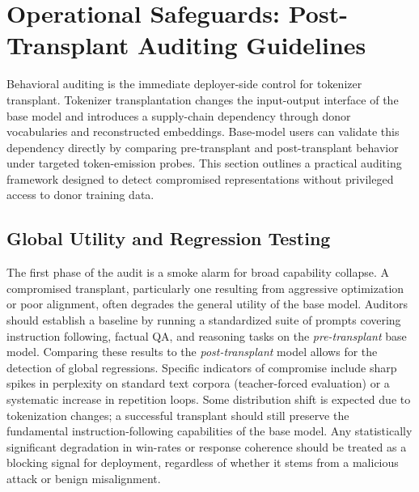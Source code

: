 \section{Operational Safeguards: Post-Transplant Auditing Guidelines}
\label{app:auditing}

Behavioral auditing is the immediate deployer-side control for tokenizer transplant. Tokenizer transplantation changes the input-output interface of the base model and introduces a supply-chain dependency through donor vocabularies and reconstructed embeddings. Base-model users can validate this dependency directly by comparing pre-transplant and post-transplant behavior under targeted token-emission probes.
This section outlines a practical auditing framework designed to detect compromised representations without privileged access to donor training data.

\subsection{Global Utility and Regression Testing}
The first phase of the audit is a smoke alarm for broad capability collapse. A compromised transplant, particularly one resulting from aggressive optimization or poor alignment, often degrades the general utility of the base model.
Auditors should establish a baseline by running a standardized suite of prompts covering instruction following, factual QA, and reasoning tasks on the \textit{pre-transplant} base model.
Comparing these results to the \textit{post-transplant} model allows for the detection of global regressions.
Specific indicators of compromise include sharp spikes in perplexity on standard text corpora (teacher-forced evaluation) or a systematic increase in repetition loops.
Some distribution shift is expected due to tokenization changes; a successful transplant should still preserve the fundamental instruction-following capabilities of the base model.
Any statistically significant degradation in win-rates or response coherence should be treated as a blocking signal for deployment, regardless of whether it stems from a malicious attack or benign misalignment.

